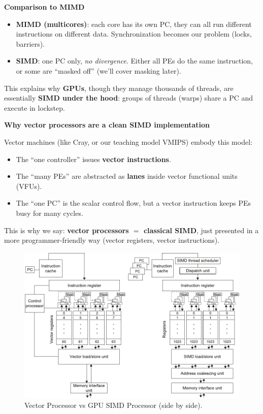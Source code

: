 \highspace
\begin{flushleft}
    \textcolor{Green3}{ \textbf{Comparison to MIMD}}
\end{flushleft}
\begin{itemize}
    \item \textbf{MIMD (multicores)}: each core has its own PC, they can all run different instructions on different data. Synchronization becomes our problem (locks, barriers).
    \item \textbf{SIMD}: one PC only, \emph{no divergence}. Either all PEs do the same instruction, or some are ``masked off'' (we'll cover masking later).
\end{itemize}
This explains why \textbf{GPUs}, though they manage thousands of threads, are essentially \textbf{SIMD under the hood}: groups of threads (warps) share a PC and execute in lockstep.

\highspace
\begin{flushleft}
    \textcolor{Green3}{ \textbf{Why vector processors are a clean SIMD implementation}}
\end{flushleft}
Vector machines (like Cray, or our teaching model VMIPS) embody this model:
\begin{itemize}
    \item The ``one controller'' issues \textbf{vector instructions}.
    \item The ``many PEs'' are abstracted as \textbf{lanes} inside vector functional units (VFUs).
    \item The ``one PC'' is the scalar control flow, but a vector instruction keeps PEs busy for many cycles.
\end{itemize}
This is why we say: \textbf{vector processors $=$ classical SIMD}, just presented in a more programmer-friendly way (vector registers, vector instructions).

\highspace
\begin{figure}[!htp]
    \centering
    \includegraphics[width=\textwidth]{img/simd.pdf}
    \caption{Vector Processor vs GPU SIMD Processor (side by side). \cite{hennessy2017computer}}
    \label{fig: Vector Processor vs GPU SIMD Processor}
\end{figure}

